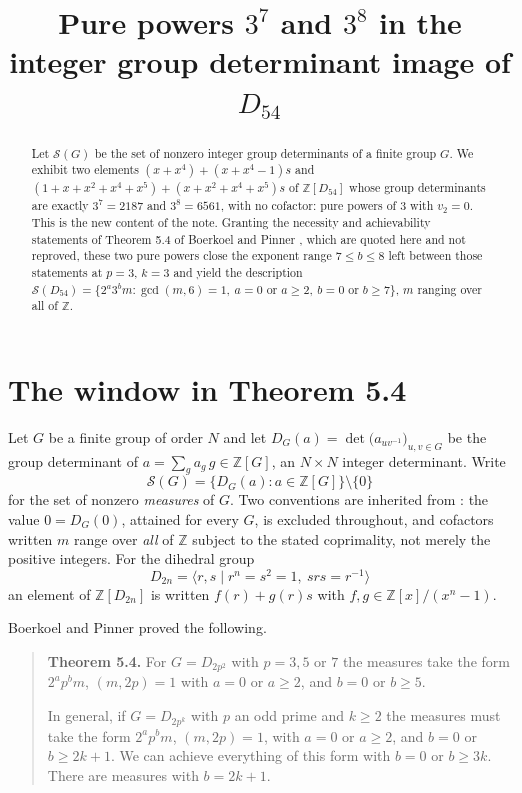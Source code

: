 \documentclass[11pt]{amsart}
\title[Pure powers in the determinant image of $D_{54}$]
{Pure powers $3^7$ and $3^8$ in the integer group determinant image of $D_{54}$}
\date{}
\theoremstyle{remark}
\newcommand{\ZZ}{\mathbb Z}
\newcommand{\Sset}{\mathcal S}
\begin{document}
\begin{abstract}
Let $\Sset(G)$ be the set of nonzero integer group determinants of a finite
group $G$. We exhibit two elements
$(x+x^4)+(x+x^4-1)s$ and
$(1+x+x^2+x^4+x^5)+(x+x^2+x^4+x^5)s$
of $\ZZ[D_{54}]$ whose group determinants are exactly $3^7=2187$ and
$3^8=6561$, with no cofactor: pure powers of $3$ with $v_2=0$. This is the new
content of the note. Granting the necessity and achievability statements of
Theorem 5.4 of Boerkoel and Pinner \cite{BP}, which are quoted here and not
reproved, these two pure powers close the exponent range $7\le b\le8$ left
between those statements at $p=3$, $k=3$ and yield the description
$\Sset(D_{54})=\{2^a3^bm:\gcd(m,6)=1,\ a=0\text{ or }a\ge2,\ b=0\text{ or }
b\ge7\}$, $m$ ranging over all of $\ZZ$.
\end{abstract}

\maketitle

\section{The window in Theorem 5.4}

Let $G$ be a finite group of order $N$ and let
$D_G(a)=\det\bigl(a_{uv^{-1}}\bigr)_{u,v\in G}$ be the group determinant of
$a=\sum_{g}a_g\,g\in\ZZ[G]$, an $N\times N$ integer determinant. Write
\[
 \Sset(G)=\{D_G(a):a\in\ZZ[G]\}\setminus\{0\}
\]
for the set of nonzero \emph{measures} of $G$. Two conventions are inherited
from \cite{BP}: the value $0=D_G(0)$, attained for every $G$, is excluded
throughout, and cofactors written $m$ range over \emph{all} of $\ZZ$ subject to
the stated coprimality, not merely the positive integers.
For the dihedral group
\[
 D_{2n}=\langle r,s \mid r^n=s^2=1,\ srs=r^{-1}\rangle
\]
an element of $\ZZ[D_{2n}]$ is written $f(r)+g(r)s$ with
$f,g\in\ZZ[x]/(x^n-1)$.

Boerkoel and Pinner \cite{BP} proved the following.

\begin{quote}
\textbf{Theorem 5.4.} For $G=D_{2p^2}$ with $p=3,5$ or $7$ the measures take
the form $2^ap^bm$, $(m,2p)=1$ with $a=0$ or $a\ge2$, and $b=0$ or $b\ge5$.

In general, if $G=D_{2p^k}$ with $p$ an odd prime and $k\ge2$ the measures must
take the form $2^ap^bm$, $(m,2p)=1$, with $a=0$ or $a\ge2$, and $b=0$ or
$b\ge2k+1$. We can achieve everything of this form with $b=0$ or $b\ge3k$.
There are measures with $b=2k+1$.
\end{quote}
\end{document}
